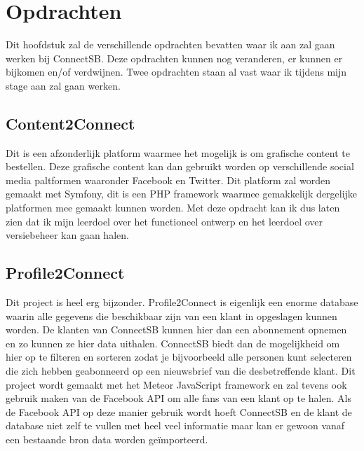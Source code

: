 
\section{Opdrachten}
Dit hoofdstuk zal de verschillende opdrachten bevatten waar ik aan zal gaan werken bij ConnectSB. Deze opdrachten kunnen nog veranderen, er kunnen er bijkomen en/of verdwijnen. Twee opdrachten staan al vast waar ik tijdens mijn stage aan zal gaan werken.

\subsection{Content2Connect}
Dit is een afzonderlijk platform waarmee het mogelijk is om grafische content te bestellen. Deze grafische content kan dan gebruikt worden op verschillende social media paltformen waaronder Facebook en Twitter. Dit platform zal worden gemaakt met Symfony, dit is een PHP framework waarmee gemakkelijk dergelijke platformen mee gemaakt kunnen worden. Met deze opdracht kan ik dus laten zien dat ik mijn leerdoel over het functioneel ontwerp en het leerdoel over versiebeheer kan gaan halen.

\subsection{Profile2Connect}
Dit project is heel erg bijzonder. Profile2Connect is eigenlijk een enorme database waarin alle gegevens die beschikbaar zijn van een klant in opgeslagen kunnen worden. De klanten van ConnectSB kunnen hier dan een abonnement opnemen en zo kunnen ze hier data uithalen. ConnectSB biedt dan de mogelijkheid om hier op te filteren en sorteren zodat je bijvoorbeeld alle personen kunt selecteren die zich hebben geabonneerd op een nieuwsbrief van die desbetreffende klant. Dit project wordt gemaakt met het Meteor JavaScript framework en zal tevens ook gebruik maken van de Facebook API om alle fans van een klant op te halen. Als de Facebook API op deze manier gebruik wordt hoeft ConnectSB en de klant de database niet zelf te vullen met heel veel informatie maar kan er gewoon vanaf een bestaande bron data worden geïmporteerd.

\clearpage

